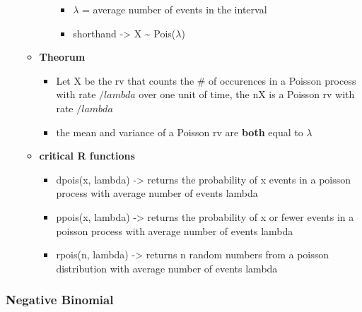 \documentclass[
]{article}
\providecommand{\tightlist}{%
  \setlength{\itemsep}{0pt}\setlength{\parskip}{0pt}}
\begin{document}
\begin{itemize}
\begin{itemize}
\begin{itemize}
      \begin{itemize}
      \tightlist
      \item
        \(\lambda\) = average number of events in the interval
      \item
        shorthand -\textgreater{} X \textasciitilde{} Pois(\(\lambda\))
      \end{itemize}
    \end{itemize}
  \item
    \textbf{Theorum}

    \begin{itemize}
    \tightlist
    \item
      Let X be the rv that counts the \# of occurences in a Poisson
      process with rate \(/lambda\) over one unit of time, the nX is a
      Poisson rv with rate \(/lambda\)
    \item
      the mean and variance of a Poisson rv are \textbf{both} equal to
      \(\lambda\)
    \end{itemize}
  \item
    \textbf{critical R functions}

    \begin{itemize}
    \tightlist
    \item
      dpois(x, lambda) -\textgreater{} returns the probability of x
      events in a poisson process with average number of events lambda
    \item
      ppois(x, lambda) -\textgreater{} returns the probability of x or
      fewer events in a poisson process with average number of events
      lambda
    \item
      rpois(n, lambda) -\textgreater{} returns n random numbers from a
      poisson distribution with average number of events lambda
    \end{itemize}
  \end{itemize}
\end{itemize}

\hypertarget{negative-binomial}{%
\subsubsection{Negative Binomial}\label{negative-binomial}}
\end{document}
